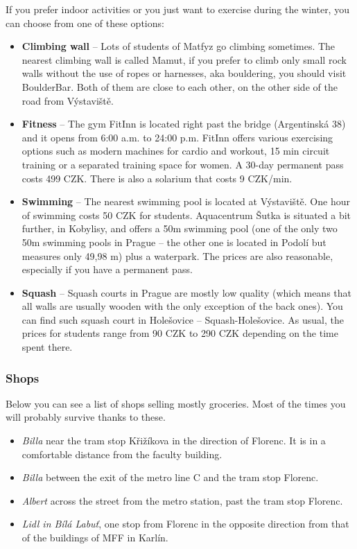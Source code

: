 If you prefer indoor activities or you just want to exercise during the winter,
you can choose from one of these options:
\begin{itemize}
\item \textbf{Climbing wall} – Lots of students of Matfyz go climbing sometimes.
The nearest climbing wall is called Mamut, if you prefer to climb only small
rock walls without the use of ropes or harnesses, aka bouldering, you should
visit BoulderBar.
Both of them are close to each other, on the other side of the road from
Výstaviště.
\item \textbf{Fitness} – The gym FitInn is located right past the bridge
(Argentinská 38) and it opens from 6:00 a.m. to 24:00 p.m.
FitInn offers various exercising options such as modern machines for cardio and
workout, 15 min circuit training or a separated training space for women.
A 30-day permanent pass costs 499 CZK. There is also a solarium that costs 9
CZK/min.
\item \textbf{Swimming} – The nearest swimming pool is located at Výstaviště.
One hour of swimming costs 50 CZK for students. Aquacentrum Šutka is situated a
bit further, in Kobylisy, and offers a 50m swimming pool (one of the only two
50m swimming pools in Prague -- the other one is located in Podolí but measures
only 49,98 m) plus a waterpark. The prices are also reasonable, especially if
you have a permanent pass.
\item \textbf{Squash} – Squash courts in Prague are mostly low quality (which
means that all walls are usually wooden with the only exception of the back
ones).
You can find such squash court in Holešovice -- Squash-Holešovice. As usual, the
prices for students range from 90 CZK to 290 CZK depending on the time spent
there.
\end{itemize}


\subsubsection{Shops}
Below you can see a list of shops selling mostly groceries. Most of the times
you will probably survive thanks to these.

\begin{itemize}
\item \textit{Billa} near the tram stop Křižíkova in the direction of Florenc.
It is in a comfortable distance from the faculty building.
\item \textit{Billa} between the exit of the metro line C and the tram stop
Florenc.
\item \textit{Albert} across the street from the metro station, past the tram
stop Florenc.
\item \textit{Lidl in Bílá Labuť}, one stop from Florenc in the opposite
direction from that of the buildings of MFF in Karlín.
\end{itemize}

